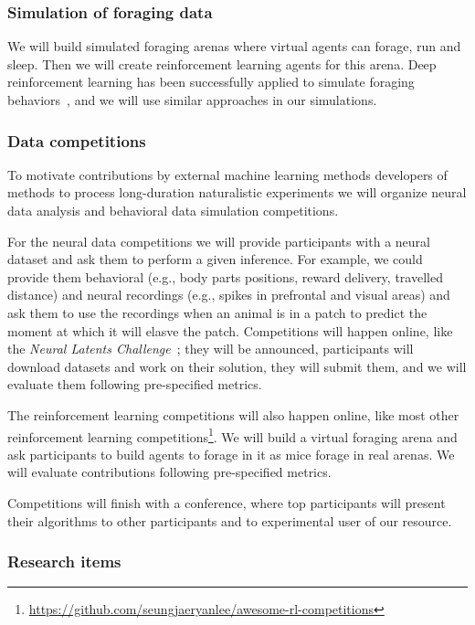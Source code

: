 \subsubsection{Simulation of foraging data}

We will build simulated foraging arenas where virtual agents can forage, run
and sleep. Then we will create reinforcement learning agents for this arena.
Deep reinforcement learning has been successfully applied to simulate foraging
behaviors~\citep{wispinskiEtAl22}, and we will use similar approaches in our
simulations.

\subsubsection{Data competitions}

To motivate contributions by external machine learning methods developers of
methods to process long-duration naturalistic experiments we will organize
neural data analysis and behavioral data simulation competitions.

For the neural data competitions we will provide participants with a neural
dataset and ask them to perform a given inference. For example, we could
provide them behavioral (e.g., body parts positions, reward delivery, travelled
distance) and neural recordings (e.g., spikes in prefrontal and visual areas)
and ask them to use the recordings when an animal is in a patch to predict the
moment at which it will elasve the patch. Competitions will happen online, like
the \emph{Neural Latents Challenge}~\citep{peiEtAl22}; they will be announced,
participants will download datasets and work on their solution, they will
submit them, and we will evaluate them following pre-specified metrics.

The reinforcement learning competitions will also happen online, like most
other reinforcement learning
competitions\footnote{\url{https://github.com/seungjaeryanlee/awesome-rl-competitions}}.
We will build a virtual foraging arena and ask participants to build agents to
forage in it as mice forage in real arenas. We will evaluate contributions
following pre-specified metrics.

Competitions will finish with a conference, where top participants will present
their algorithms to other participants and to experimental user of our
resource.

\subsubsection{Research items}
\label{sec:research}

